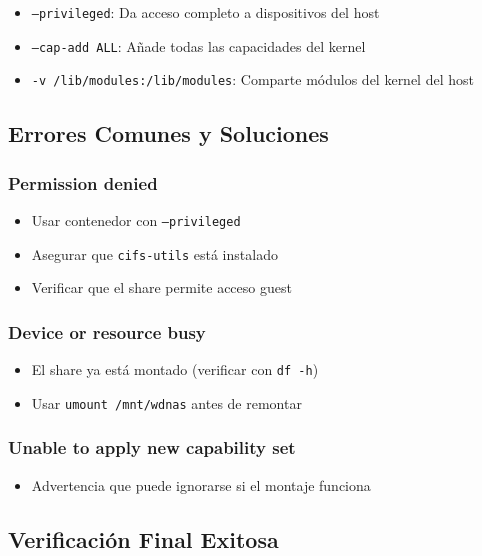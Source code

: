\documentclass[12pt, a4paper]{article}
\begin{document}
\begin{itemize}
    \item \texttt{--privileged}: Da acceso completo a dispositivos del host
    \item \texttt{--cap-add ALL}: Añade todas las capacidades del kernel
    \item \texttt{-v /lib/modules:/lib/modules}: Comparte módulos del kernel del host
\end{itemize}

\subsection{Errores Comunes y Soluciones}
\label{subsec:errores_comunes}

\subsubsection{Permission denied}
\begin{itemize}
    \item Usar contenedor con \texttt{--privileged}
    \item Asegurar que \texttt{cifs-utils} está instalado
    \item Verificar que el share permite acceso guest
\end{itemize}

\subsubsection{Device or resource busy}
\begin{itemize}
    \item El share ya está montado (verificar con \texttt{df -h})
    \item Usar \texttt{umount /mnt/wdnas} antes de remontar
\end{itemize}

\subsubsection{Unable to apply new capability set}
\begin{itemize}
    \item Advertencia que puede ignorarse si el montaje funciona
\end{itemize}

\subsection{Verificación Final Exitosa}
\label{subsec:verificacion_final}
\end{document}
